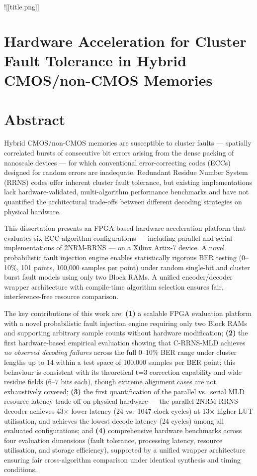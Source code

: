\documentclass[
  12pt,
  a4paper]{report}
\author{}
\date{}
\begin{document}
{
\setcounter{tocdepth}{2}
\tableofcontents
}
!{[}{[}title.png{]}{]}

\chapter{Hardware Acceleration for Cluster Fault Tolerance in Hybrid
CMOS/non-CMOS
Memories}\label{hardware-acceleration-for-cluster-fault-tolerance-in-hybrid-cmosnon-cmos-memories}

\chapter{Abstract}\label{abstract}

Hybrid CMOS/non-CMOS memories are susceptible to cluster faults ---
spatially correlated bursts of consecutive bit errors arising from the
dense packing of nanoscale devices --- for which conventional
error-correcting codes (ECCs) designed for random errors are inadequate.
Redundant Residue Number System (RRNS) codes offer inherent cluster
fault tolerance, but existing implementations lack hardware-validated,
multi-algorithm performance benchmarks and have not quantified the
architectural trade-offs between different decoding strategies on
physical hardware.

This dissertation presents an FPGA-based hardware acceleration platform
that evaluates six ECC algorithm configurations --- including parallel
and serial implementations of 2NRM-RRNS --- on a Xilinx Artix-7 device.
A novel probabilistic fault injection engine enables statistically
rigorous BER testing (0--10\%, 101 points, 100,000 samples per point)
under random single-bit and cluster burst fault models using only two
Block RAMs. A unified encoder/decoder wrapper architecture with
compile-time algorithm selection ensures fair, interference-free
resource comparison.

The key contributions of this work are: \textbf{(1)} a scalable FPGA
evaluation platform with a novel probabilistic fault injection engine
requiring only two Block RAMs and supporting arbitrary sample counts
without hardware modification; \textbf{(2)} the first hardware-based
empirical evaluation showing that C-RRNS-MLD achieves \emph{no observed
decoding failures} across the full 0--10\% BER range under cluster
lengths up to 14 within a test space of 100,000 samples per BER point;
this behaviour is consistent with its theoretical t=3 correction
capability and wide residue fields (6--7 bits each), though extreme
alignment cases are not exhaustively covered; \textbf{(3)} the first
quantification of the parallel vs.~serial MLD resource-latency trade-off
on physical hardware --- the parallel 2NRM-RRNS decoder achieves 43×
lower latency (24 vs.~1047 clock cycles) at 13× higher LUT utilisation,
and achieves the lowest decode latency (24 cycles) among all evaluated
configurations; and \textbf{(4)} comprehensive hardware benchmarks
across four evaluation dimensions (fault tolerance, processing latency,
resource utilisation, and storage efficiency), supported by a unified
wrapper architecture ensuring fair cross-algorithm comparison under
identical synthesis and timing conditions.
\end{document}
